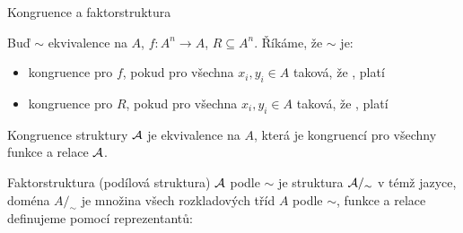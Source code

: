 \documentclass{beamer}
\begin{document}
\begin{frame}{Kongruence a faktorstruktura}
    
        Buď $\sim$ ekvivalence na $A$, $f\colon A^n\to A$, $R\subseteq A^n$. Říkáme, že $\sim$ je:
        \begin{itemize}
            \item \alert{kongruence pro $f$}, pokud pro všechna $x_i,y_i\in A$ taková, že , platí 
            \item \alert{kongruence pro $R$}, pokud pro všechna $x_i,y_i\in A$ taková, že , platí 
        \end{itemize}    
        \alert{Kongruence} struktury $\mathcal{A}$ je ekvivalence na $A$, která je kongruencí pro všechny funkce a relace $\mathcal{A}$. 
    
        \alert{Faktorstruktura (podílová struktura)} $\mathcal{A}$ podle $\sim$ je struktura \alert{$\mathcal{A}/_\sim$ } v témž jazyce, doména $A/_\sim$ je množina všech rozkladových tříd $A$ podle $\sim$, funkce a relace definujeme \alert{pomocí reprezentantů}:
        
        
\end{frame}
\end{document}
